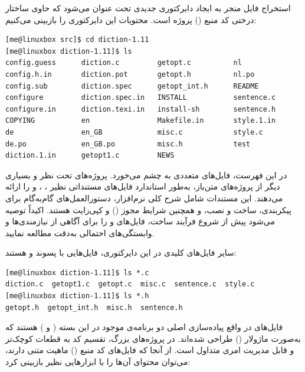 استخراج فایل  منجر به ایجاد دایرکتوری جدیدی تحت عنوان  می‌شود که حاوی ساختار درختی کد منبع () پروژه است. محتویات این دایرکتوری را بازبینی می‌کنیم:

\begin{latin}
\begin{lstlisting}
[me@linuxbox src]$ cd diction-1.11
[me@linuxbox diction-1.11]$ ls
config.guess      diction.c         getopt.c          nl
config.h.in       diction.pot       getopt.h          nl.po
config.sub        diction.spec      getopt_int.h      README
configure         diction.spec.in   INSTALL           sentence.c
configure.in      diction.texi.in   install-sh        sentence.h
COPYING           en                Makefile.in       style.1.in
de                en_GB             misc.c            style.c
de.po             en_GB.po          misc.h            test
diction.1.in      getopt1.c         NEWS
\end{lstlisting}
\end{latin}

در این فهرست، فایل‌های متعددی به چشم می‌خورد. پروژه‌های تحت نظر  و بسیاری دیگر از پروژه‌های متن‌باز، به‌طور استاندارد فایل‌های مستنداتی نظیر ، ،  و  را ارائه می‌دهند. این مستندات شامل شرح کلی نرم‌افزار، دستورالعمل‌های گام‌به‌گام برای پیکربندی، ساخت و نصب، و همچنین شرایط مجوز () و کپی‌رایت هستند. اکیداً توصیه می‌شود پیش از شروع فرآیند ساخت، فایل‌های  و  را برای آگاهی از نیازمندی‌ها و وابستگی‌های احتمالی به‌دقت مطالعه نمایید.

سایر فایل‌های کلیدی در این دایرکتوری، فایل‌هایی با پسوند  و  هستند:

\begin{latin}
\begin{lstlisting}
[me@linuxbox diction-1.11]$ ls *.c
diction.c  getopt1.c  getopt.c  misc.c  sentence.c  style.c
[me@linuxbox diction-1.11]$ ls *.h
getopt.h  getopt_int.h  misc.h  sentence.h
\end{lstlisting}
\end{latin}

فایل‌های  در واقع پیاده‌سازی اصلی دو برنامه‌ی موجود در این بسته ( و ) هستند که به‌صورت ماژولار () طراحی شده‌اند. در پروژه‌های بزرگ، تقسیم کد به قطعات کوچک‌تر و قابل مدیریت امری متداول است. از آنجا که فایل‌های کد منبع () ماهیت متنی دارند، می‌توان محتوای آن‌ها را با ابزارهایی نظیر  بازبینی کرد:

